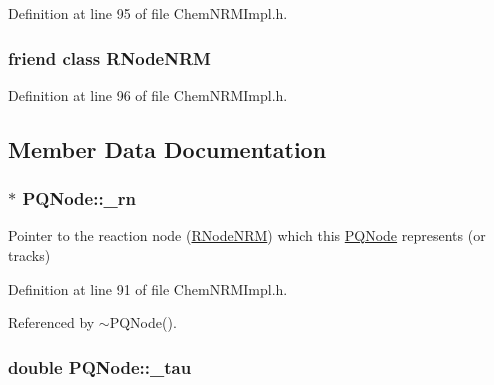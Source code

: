 Definition at line 95 of file Chem\+N\+R\+M\+Impl.\+h.

\hypertarget{classPQNode_a9dfcd0d41325e8ca108cba1768ebab89}{
\subsubsection[{R\+Node\+N\+R\+M}]{\setlength{\rightskip}{0pt plus 5cm}friend class {\bf R\+Node\+N\+R\+M}\hspace{0.3cm}{\ttfamily [friend]}}}\label{classPQNode_a9dfcd0d41325e8ca108cba1768ebab89}


Definition at line 96 of file Chem\+N\+R\+M\+Impl.\+h.



\subsection{Member Data Documentation}
\hypertarget{classPQNode_a3405abd2d51a7cdde311fda2185fc50e}{
\subsubsection[{\+\_\+rn}]{$\ast$ P\+Q\+Node\+::\+\_\+rn\hspace{0.3cm}{\ttfamily [private]}}}\label{classPQNode_a3405abd2d51a7cdde311fda2185fc50e}


Pointer to the reaction node (\hyperlink{classRNodeNRM}{R\+Node\+N\+R\+M}) which this \hyperlink{classPQNode}{P\+Q\+Node} represents (or tracks) 



Definition at line 91 of file Chem\+N\+R\+M\+Impl.\+h.



Referenced by $\sim$\+P\+Q\+Node().

\hypertarget{classPQNode_a1cf2f8482af1add65c9b6c35bfa0857f}{
\subsubsection[{\+\_\+tau}]{\setlength{\rightskip}{0pt plus 5cm}double P\+Q\+Node\+::\+\_\+tau\hspace{0.3cm}{\ttfamily [private]}}}\label{classPQNode_a1cf2f8482af1add65c9b6c35bfa0857f}


